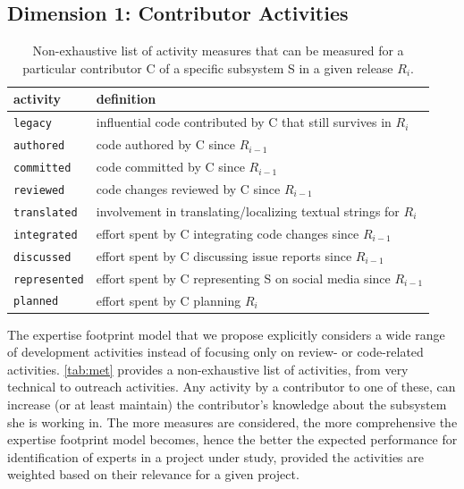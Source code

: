 \subsection{Dimension 1: Contributor Activities}
\label{sec:contribution-metrics}

\begin{table}[t]
\begin{center}
\begin{tabular}{ll}
activity & definition\\
\hline
\texttt{legacy} & influential code contributed by C that still survives in $R_i$\\
\texttt{authored} & code authored by C since $R_{i-1}$\\
\texttt{committed} & code committed by C since $R_{i-1}$\\
  \texttt{reviewed} & code changes reviewed by C since $R_{i-1}$\\
    \texttt{translated} & involvement in translating/localizing textual strings for $R_{i}$\\
  \texttt{integrated} & effort spent by C integrating code changes since $R_{i-1}$\\
  \texttt{discussed} & effort spent by C discussing issue reports since $R_{i-1}$\\
  \texttt{represented} & effort spent by C representing S on social media since $R_{i-1}$\\
      \texttt{planned} & effort spent by C planning $R_{i}$\\
\end{tabular}
\end{center}
\caption{Non-exhaustive list of activity measures that can be measured for a particular contributor C of a specific subsystem S in a given release $R_i$.}
\label{tab:met}
\end{table}

The expertise footprint model that we propose explicitly considers a wide range of development activities instead of focusing only on review- or code-related activities. \autoref{tab:met} provides a non-exhaustive list of activities, from very technical to outreach activities. Any activity by a contributor to one of these, can increase (or at least maintain) the contributor's knowledge about the subsystem she is working in. The more measures are considered, the more comprehensive the expertise footprint model becomes, hence the better the expected performance for identification of experts in a project under study, provided the activities are weighted based on their relevance for a given project.

